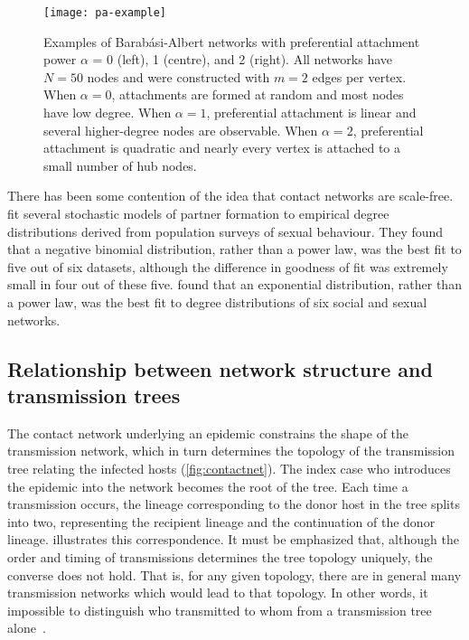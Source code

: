 \begin{figure}
  \texttt{[image: pa-example]}
  \caption[
    Examples of Barab\'asi-Albert networks with preferential attachment power
    $\alpha$ = 0, 1, and 2.
  ]{
    Examples of Barab\'asi-Albert networks with preferential attachment power
    $\alpha$ = 0 (left), 1 (centre), and 2 (right). All networks have $N = 50$
    nodes and were constructed with $m = 2$ edges per vertex. When $\alpha =
    0$, attachments are formed at random and most nodes have low degree. When
    $\alpha = 1$, preferential attachment is linear and several higher-degree
    nodes are observable. When $\alpha = 2$, preferential attachment is
    quadratic and nearly every vertex is attached to a small number of hub
    nodes.
  }
  \label{fig:baeg}
\end{figure}

There has been some contention of the idea that contact networks are
scale-free. \textcite{handcock2004likelihood} fit several stochastic models of
partner formation to empirical degree distributions derived from population
surveys of sexual behaviour. They found that a negative binomial distribution,
rather than a power law, was the best fit to five out of six datasets, although
the difference in goodness of fit was extremely small in four out of these
five. \textcite{bansal2007individual} found that an exponential distribution,
rather than a power law, was the best fit to degree distributions of six social
and sexual networks. 

\subsection{Relationship between network structure and transmission trees}

The contact network underlying an epidemic constrains the shape of the
transmission network, which in turn determines the topology of the transmission
tree relating the infected hosts (\cref{fig:contactnet}). The index case who
introduces the epidemic into the network becomes the root of the tree. Each
time a transmission occurs, the lineage corresponding to the donor host in the
tree splits into two, representing the recipient lineage and the continuation
of the donor lineage.  illustrates this correspondence.
It must be emphasized that, although the order and timing of transmissions
determines the tree topology uniquely, the converse does not hold. That is, for
any given topology, there are in general many transmission networks which would
lead to that topology. In other words, it impossible to distinguish who
transmitted to whom from a transmission tree alone~\autocite{bernard2007hiv}.

